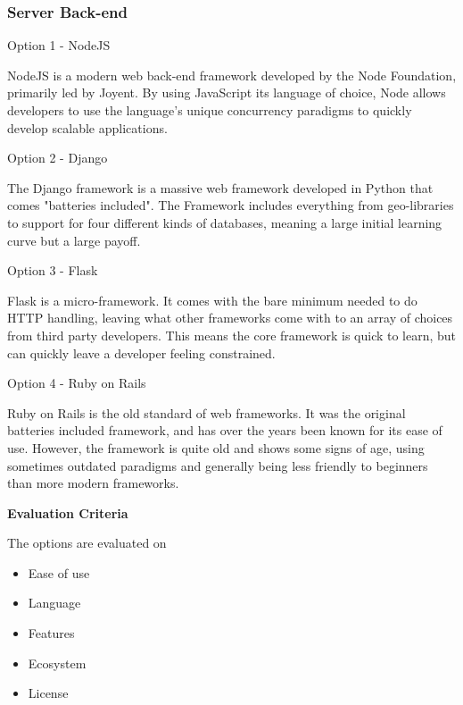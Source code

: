 \documentclass[letterpaper, 10pt, draftclsnofoot, compsoc, onecolumn]{IEEEtran}
\begin{document}
{\subsubsection{Server Back-end}
{\noindent Option 1 - NodeJS \par}
{\noindent NodeJS is a modern web back-end framework developed by the Node Foundation,
primarily led by Joyent. By using JavaScript its language of choice, Node allows
developers to use the language's unique concurrency paradigms to quickly develop
scalable applications. \par}
{\noindent Option 2 - Django \par}
{\noindent The Django framework is a massive web framework developed in Python that comes "batteries
included". The Framework includes everything from geo-libraries to support for four different kinds of
databases, meaning a large initial learning curve but a large payoff. \par}
{\noindent Option 3 - Flask \par}
{\noindent Flask is a micro-framework. It comes with the bare minimum needed to do HTTP handling, leaving
what other frameworks come with to an array of choices from third party developers. This means the core
framework is quick to learn, but can quickly leave a developer feeling constrained. \par}
{\noindent Option 4 - Ruby on Rails \par}
{\noindent Ruby on Rails is the old standard of web frameworks. It was the original batteries included
framework, and has over the years been known for its ease of use. However, the framework is quite old
and shows some signs of age, using sometimes outdated paradigms and generally being less friendly to beginners
than more modern frameworks. \par}

\medskip
\newpage
{\noindent\rmfamily\bfseries\color{black} Evaluation Criteria \par}
{\noindent The options are evaluated on

\begin{itemize}
\item Ease of use
\item Language
\item Features
\item Ecosystem
\item License
\end{itemize}

 \par}

}
\end{document}
